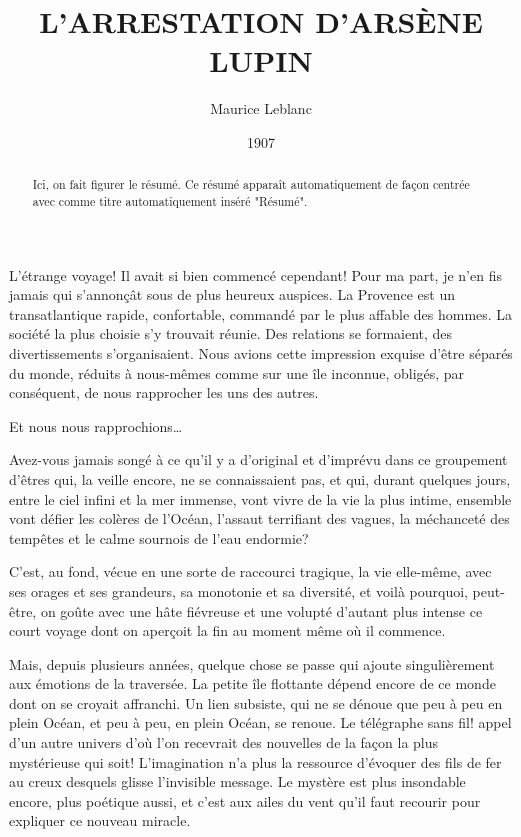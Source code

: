 \documentclass[12pt,a4paper]{article}
\begin{document}
\title{L’ARRESTATION D’ARSÈNE LUPIN}
\author{Maurice Leblanc}
\date{1907}

\maketitle

\begin{abstract}
    Ici, on fait figurer le résumé. Ce résumé apparaît automatiquement de façon centrée avec comme 
    titre automatiquement inséré "Résumé". 
\end{abstract}


L’étrange voyage! Il avait si bien commencé cependant! Pour ma part, je n’en fis jamais qui s’annonçât sous de plus heureux auspices. La Provence est un transatlantique rapide, confortable, commandé par le plus affable des hommes. La société la plus choisie s’y trouvait réunie. Des relations se formaient, des divertissements s’organisaient. Nous avions cette impression exquise d’être séparés du monde, réduits à nous-mêmes comme sur une île inconnue, obligés, par conséquent, de nous rapprocher les uns des autres.

Et nous nous rapprochions…

Avez-vous jamais songé à ce qu’il y a d’original et d’imprévu dans ce groupement d’êtres qui, la veille encore, ne se connaissaient pas, et qui, durant quelques jours, entre le ciel infini et la mer immense, vont vivre de la vie la plus intime, ensemble vont défier les colères de l’Océan, l’assaut terrifiant des vagues, la méchanceté des tempêtes et le calme sournois de l’eau endormie?

C’est, au fond, vécue en une sorte de raccourci tragique, la vie elle-même, avec ses orages et ses grandeurs, sa monotonie et sa diversité, et voilà pourquoi, peut-être, on goûte avec une hâte fiévreuse et une volupté d’autant plus intense ce court voyage dont on aperçoit la fin au moment même où il commence.

Mais, depuis plusieurs années, quelque chose se passe qui ajoute singulièrement aux émotions de la traversée. La petite île flottante dépend encore de ce monde dont on se croyait affranchi. Un lien subsiste, qui ne se dénoue que peu à peu en plein Océan, et peu à peu, en plein Océan, se renoue. Le télégraphe sans fil! appel d’un autre univers d’où l’on recevrait des nouvelles de la façon la plus mystérieuse qui soit! L’imagination n’a plus la ressource d’évoquer des fils de fer au creux desquels glisse l’invisible message. Le mystère est plus insondable encore, plus poétique aussi, et c’est aux ailes du vent qu’il faut recourir pour expliquer ce nouveau miracle.
\end{document}
